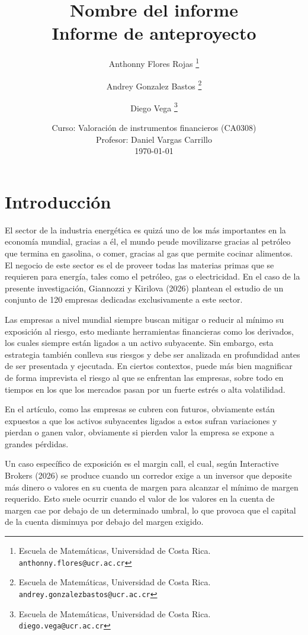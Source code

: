 \documentclass[11pt,letterpaper]{article}
\title{
    \textbf{Nombre del informe}\\[0.4em]
    \large Informe de anteproyecto
}
\author{%
    {Anthonny Flores Rojas}
    \thanks{
        Escuela de Matemáticas,
        Universidad de Costa Rica.
        \texttt{anthonny.flores@ucr.ac.cr}
    }
    \and
    {Andrey Gonzalez Bastos}
    \thanks{
        Escuela de Matemáticas,
        Universidad de Costa Rica.
        \texttt{andrey.gonzalezbastos@ucr.ac.cr}
    }
    \and
    {Diego Vega}
    \thanks{
        Escuela de Matemáticas,
        Universidad de Costa Rica.
        \texttt{diego.vega@ucr.ac.cr}
    }
}
\date{
    Curso: Valoración de instrumentos financieros (CA0308)\\
    Profesor: Daniel Vargas Carrillo\\[0.3em]
    \today
}
\theoremstyle{plain}
\theoremstyle{definition}
\theoremstyle{remark}
\numberwithin{equation}{section}
\begin{document}
	
	
	\maketitle
	\tableofcontents   %
	
\section{Introducción}\label{sec:intro}

El sector de la industria energética es quizá uno de los más importantes en la economía mundial, gracias a él, el mundo peude movilizarse gracias al petróleo que termina en gasolina, o comer, gracias al gas que permite cocinar alimentos. El negocio de este sector es el de proveer todas las materias primas que se requieren para energía, tales como el petróleo, gas o electricidad. En el caso de la presente investigación, Giannozzi y Kirilova (2026) plantean el estudio de un conjunto de 120 empresas dedicadas exclusivamente a este sector. \vspace{0.50 cm}

Las empresas a nivel mundial siempre buscan mitigar o reducir al mínimo su exposición al riesgo, esto mediante herramientas financieras como los derivados, los cuales siempre están ligados a un activo subyacente. Sin embargo, esta estrategia también conlleva sus riesgos y debe ser analizada en profundidad antes de ser presentada y ejecutada. En ciertos contextos, puede más bien magnificar de forma imprevista el riesgo al que se enfrentan las empresas, sobre todo en tiempos en los que los mercados pasan por un fuerte estrés o alta volatilidad. 
\vspace{0.50 cm}

En el artículo, como las empresas se cubren con futuros, obviamente están expuestos a que los activos subyacentes ligados a estos sufran variaciones y pierdan o ganen valor, obviamente si pierden valor la empresa se expone a grandes pérdidas.
\vspace{0.50 cm}

Un caso específico de exposición es el margin call, el cual, según Interactive Brokers (2026) se produce cuando un corredor exige a un inversor que deposite más dinero o valores en su cuenta de margen para alcanzar el mínimo de margen requerido. Esto suele ocurrir cuando el valor de los valores en la cuenta de margen cae por debajo de un determinado umbral, lo que provoca que el capital de la cuenta disminuya por debajo del margen exigido.
\vspace{0.50 cm}
\end{document}
